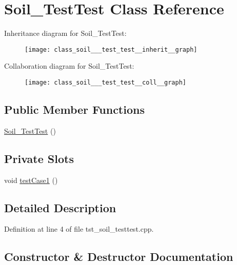 \hypertarget{class_soil___test_test}{}\section{Soil\+\_\+\+Test\+Test Class Reference}
\label{class_soil___test_test}


Inheritance diagram for Soil\+\_\+\+Test\+Test\+:\nopagebreak
\begin{figure}[H]
\begin{center}
\leavevmode
\texttt{[image: class\_soil\_\_\_test\_test\_\_inherit\_\_graph]}
\end{center}
\end{figure}


Collaboration diagram for Soil\+\_\+\+Test\+Test\+:\nopagebreak
\begin{figure}[H]
\begin{center}
\leavevmode
\texttt{[image: class\_soil\_\_\_test\_test\_\_coll\_\_graph]}
\end{center}
\end{figure}
\subsection*{Public Member Functions}
\begin{DoxyCompactItemize}
\item 
\hyperlink{class_soil___test_test_a12699725c6830a06a5ee9a8761913454}{Soil\+\_\+\+Test\+Test} ()
\end{DoxyCompactItemize}
\subsection*{Private Slots}
\begin{DoxyCompactItemize}
\item 
void \hyperlink{class_soil___test_test_ab1f2be3d9004871c3ff3b8079deeaf5c}{test\+Case1} ()
\end{DoxyCompactItemize}


\subsection{Detailed Description}


Definition at line 4 of file tst\+\_\+soil\+\_\+testtest.\+cpp.



\subsection{Constructor \& Destructor Documentation}
\hypertarget{class_soil___test_test_a12699725c6830a06a5ee9a8761913454}{}
